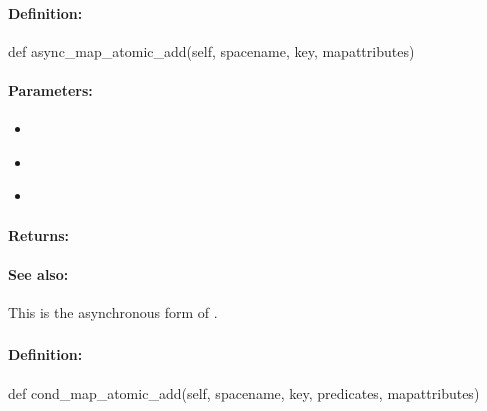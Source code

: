 \paragraph{Definition:}
\begin{pythoncode}
def async_map_atomic_add(self, spacename, key, mapattributes)
\end{pythoncode}

\paragraph{Parameters:}
\begin{itemize}[noitemsep]
\item {}\\

\item {}\\

\item {}\\

\end{itemize}

\paragraph{Returns:}


\paragraph{See also:}  This is the asynchronous form of .

\pagebreak
\subsubsection{}
\label{api:python:cond_map_atomic_add}


\paragraph{Definition:}
\begin{pythoncode}
def cond_map_atomic_add(self, spacename, key, predicates, mapattributes)
\end{pythoncode}

